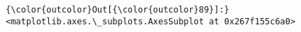 \documentclass[11pt]{article}
\begin{document}
            \begin{Verbatim}[commandchars=\\\{\}]
{\color{outcolor}Out[{\color{outcolor}89}]:} <matplotlib.axes.\_subplots.AxesSubplot at 0x267f155c6a0>
\end{Verbatim}
        
    \begin{center}
    \end{center}
    { \hspace*{\fill} \\}
    
    \begin{center}
    \end{center}
    { \hspace*{\fill} \\}
    
\end{document}
